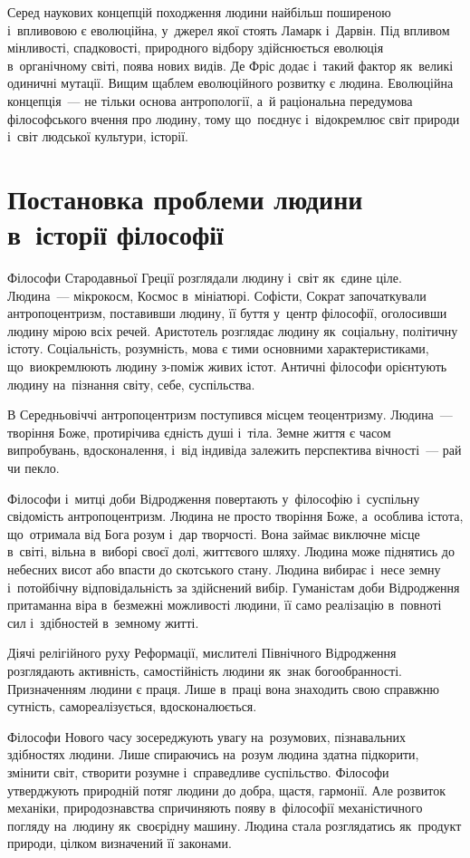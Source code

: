 \documentclass[a5paper,oneside,DIV=12,12pt,headings=small]{scrartcl}
\begin{document}
		Серед наукових концепцій походження людини найбільш поширеною і~впливовою є еволюційна, у~джерел якої стоять Ламарк і~Дарвін. Під впливом мінливості, спадковості, природного відбору здійснюється еволюція в~органічному світі, поява нових видів. Де Фріс додає і~такий фактор як~великі одиничні мутації. Вищим щаблем еволюційного розвитку є людина. Еволюційна концепція~— не тільки основа антропології, а~й раціональна передумова філософського вчення про людину, тому що~поєднує і~відокремлює світ природи і~світ людської культури, історії.

	\section{Постановка проблеми людини в~історії філософії}
		Філософи Стародавньої Греції розглядали людину і~світ як~єдине ціле. Людина~— мікрокосм, Космос в~мініатюрі. Софісти, Сократ започаткували антропоцентризм, поставивши людину, її буття у~центр філософії, оголосивши людину мірою всіх речей. Аристотель розглядає людину як~соціальну, політичну істоту. Соціальність, розумність, мова є тими основними характеристиками, що~виокремлюють людину з-поміж живих істот. Античні філософи орієнтують людину на~пізнання світу, себе, суспільства.
		
		В Середньовіччі антропоцентризм поступився місцем теоцентризму. Людина~— творіння Боже, протирічива єдність душі і~тіла. Земне життя є часом випробувань, вдосконалення, і~від індивіда залежить перспектива вічності~— рай чи пекло.
		
		Філософи і~митці доби Відродження повертають у~філософію і~суспільну свідомість антропоцентризм. Людина не просто творіння Боже, а~особлива істота, що~отримала від Бога розум і~дар творчості. Вона займає виключне місце в~світі, вільна в~виборі своєї долі, життєвого шляху. Людина може піднятись до небесних висот або впасти до скотського стану. Людина вибирає і~несе земну і~потойбічну відповідальність за здійснений вибір. Гуманістам доби Відродження притаманна віра в~безмежні можливості людини, її само реалізацію в~повноті сил і~здібностей в~земному житті.
		
		Діячі релігійного руху Реформації, мислителі Північного Відродження розглядають активність, самостійність людини як~знак богообранності. Призначенням людини є праця. Лише в~праці вона знаходить свою справжню сутність, самореалізується, вдосконалюється.
		
		Філософи Нового часу зосереджують увагу на~розумових, пізнавальних здібностях людини. Лише спираючись на~розум людина здатна підкорити, змінити світ, створити розумне і~справедливе суспільство. Філософи утверджують природній потяг людини до добра, щастя, гармонії. Але розвиток механіки, природознавства спричиняють появу в~філософії механістичного погляду на~людину як~своєрідну машину. Людина стала розглядатись як~продукт природи, цілком визначений її законами.
		
\end{document}
